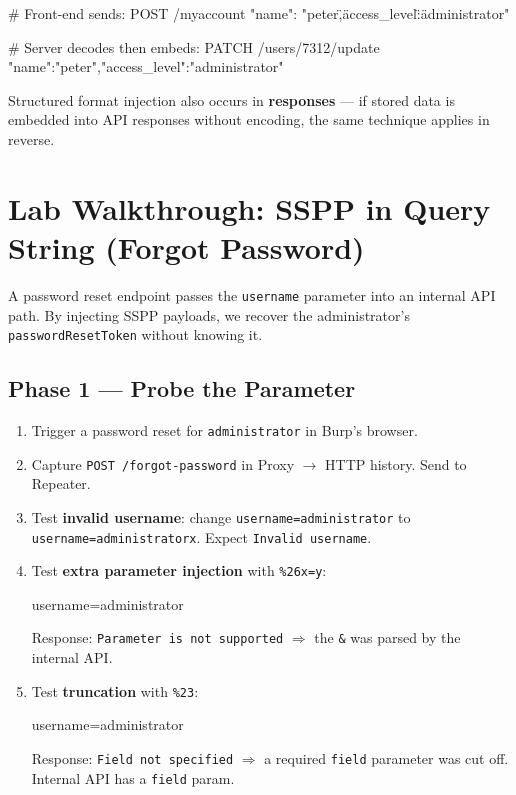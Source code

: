 \documentclass[11pt]{article}
\begin{document}
\begin{httpbox}
# Front-end sends:
POST /myaccount
{"name": "peter\",\"access_level\":\"administrator"}

# Server decodes then embeds:
PATCH /users/7312/update
{"name":"peter","access_level":"administrator"}
\end{httpbox}

\begin{notebox}[Note]
Structured format injection also occurs in \textbf{responses} --- if stored data is embedded into API responses without encoding, the same technique applies in reverse.
\end{notebox}

\section{Lab Walkthrough: SSPP in Query String (Forgot Password)}

\begin{notebox}[Scenario]
A password reset endpoint passes the \texttt{username} parameter into an internal API path. By injecting SSPP payloads, we recover the administrator's \texttt{passwordResetToken} without knowing it.
\end{notebox}

\subsection{Phase 1 --- Probe the Parameter}

\begin{enumerate}
  \item Trigger a password reset for \texttt{administrator} in Burp's browser.
  \item Capture \texttt{POST /forgot-password} in Proxy $\to$ HTTP history. Send to Repeater.
  \item Test \textbf{invalid username}: change \texttt{username=administrator} to \texttt{username=administratorx}. Expect \texttt{Invalid username}.
  \item Test \textbf{extra parameter injection} with \texttt{\%26x=y}:
\begin{httpbox}[]
username=administrator%
\end{httpbox}
  Response: \texttt{Parameter is not supported} $\Rightarrow$ the \texttt{\&} was parsed by the internal API.

  \item Test \textbf{truncation} with \texttt{\%23}:
\begin{httpbox}[]
username=administrator%
\end{httpbox}
  Response: \texttt{Field not specified} $\Rightarrow$ a required \texttt{field} parameter was cut off. Internal API has a \texttt{field} param.
\end{enumerate}
\end{document}
